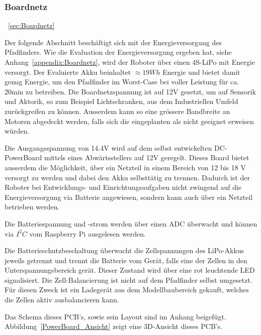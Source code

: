 \documentclass[main.tex]{subfiles} %
\begin{document}

\subsubsection{Boardnetz}~\ref{sec:Boardnetz}

Der folgende Abschnitt beschäftigt sich mit der Energieversorgung des
Pfadfinders. Wie die Evaluation der Energieversorgung ergeben hat, siehe
Anhang~\ref{appendix:Boardnetz}, wird der Roboter über einen 4S-LiPo mit
Energie versorgt. Der Evaluierte Akku beinhaltet $\approx 19Wh$ Energie und
bietet damit genug Energie, um den Pfadfinder im Worst-Case bei voller Leistung
für ca. 20min zu betreiben. Die Boardnetzspannung ist auf 12V gesetzt, um auf
Sensorik und Aktorik, so zum Beispiel Lichtschranken, aus dem Industriellen
Umfeld zurückgreifen zu können. Ausserdem kann so eine grössere Bandbreite an
Motoren abgedeckt werden, falls sich die eingeplanten als nicht geeignet
erweisen würden. 

Die Ausgangsspannung von 14.4V wird auf dem selbst entwickelten DC-PowerBoard
mittels eines Abwärtsstellers auf 12V geregelt. Dieses Board bietet ausserdem
die Möglichkeit, über ein Netzteil in einem Bereich von 12 bis 18 V versorgt zu
werden und dabei den Akku selbsttätig zu trennen. Dadurch ist der Roboter bei
Entwicklungs- und Einrichtungsaufgaben nicht zwingend auf die Energieversorgung
via Batterie angewiesen, sondern kann auch über ein Netzteil betrieben werden.

Die Batteriespannung und -strom werden über einen ADC überwacht und können via
$I^2C$ vom Raspberry Pi ausgelesen werden.

Die Batterieschutzbeschaltung überwacht die Zellspannungen des LiPo-Akkus
jeweils getrennt und trennt die Batterie vom Gerät, falls eine der Zellen in
den Unterspannungsbereich gerät. Dieser Zustand wird über eine rot leuchtende
LED signalisiert. Die Zell-Balancierung ist nicht auf dem Pfadfinder selbst
umgesetzt. Für diesen Zweck ist ein Ladegerät aus dem Modellbaubereich gekauft,
welches die Zellen aktiv ausbalancieren kann.

Das Schema dieses PCB's, sowie sein Layout sind im Anhang beigefügt.
Abbildung~\ref{PowerBoard_Ansicht} zeigt eine 3D-Ansicht dieses PCB's.
\end{document}
